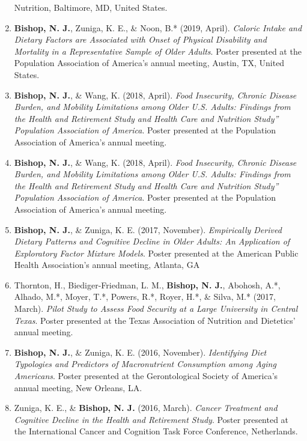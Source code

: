 \documentclass[
]{article}
\begin{document}
\begin{enumerate}
  Nutrition, Baltimore, MD, United States.
\item
  \textbf{Bishop, N. J.}, Zuniga, K. E., \& Noon, B.* (2019, April).
  \emph{Caloric Intake and Dietary Factors are Associated with Onset of
  Physical Disability and Mortality in a Representative Sample of Older
  Adults}. Poster presented at the Population Association of America's
  annual meeting, Austin, TX, United States.
\item
  \textbf{Bishop, N. J.}, \& Wang, K. (2018, April). \emph{Food
  Insecurity, Chronic Disease Burden, and Mobility Limitations among
  Older U.S. Adults: Findings from the Health and Retirement Study and
  Health Care and Nutrition Study'' Population Association of America}.
  Poster presented at the Population Association of America's annual
  meeting.
\item
  \textbf{Bishop, N. J.}, \& Wang, K. (2018, April). \emph{Food
  Insecurity, Chronic Disease Burden, and Mobility Limitations among
  Older U.S. Adults: Findings from the Health and Retirement Study and
  Health Care and Nutrition Study'' Population Association of America}.
  Poster presented at the Population Association of America's annual
  meeting.
\item
  \textbf{Bishop, N. J.}, \& Zuniga, K. E. (2017, November).
  \emph{Empirically Derived Dietary Patterns and Cognitive Decline in
  Older Adults: An Application of Exploratory Factor Mixture Models}.
  Poster presented at the American Public Health Association's annual
  meeting, Atlanta, GA
\item
  Thornton, H., Biediger-Friedman, L. M., \textbf{Bishop, N. J.},
  Abohosh, A.*, Alhado, M.*, Moyer, T.*, Powers, R.*, Royer, H.*, \&
  Silva, M.* (2017, March). \emph{Pilot Study to Assess Food Security at
  a Large University in Central Texas}. Poster presented at the Texas
  Association of Nutrition and Dietetics' annual meeting.
\item
  \textbf{Bishop, N. J.}, \& Zuniga, K. E. (2016, November).
  \emph{Identifying Diet Typologies and Predictors of Macronutrient
  Consumption among Aging Americans}. Poster presented at the
  Gerontological Society of America's annual meeting, New Orleans, LA.
\item
  Zuniga, K. E., \& \textbf{Bishop, N. J.} (2016, March). \emph{Cancer
  Treatment and Cognitive Decline in the Health and Retirement Study}.
  Poster presented at the International Cancer and Cognition Task Force
  Conference, Netherlands.
\end{enumerate}
\end{document}
